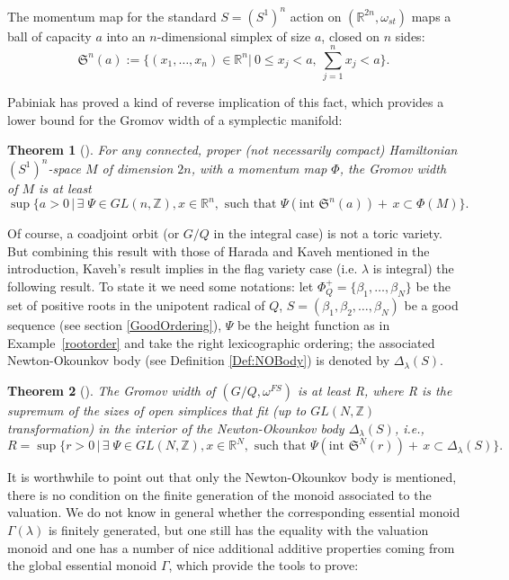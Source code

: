 \documentclass{emsprocart}
\newtheorem{theorem}{Theorem}[section]
\theoremstyle{definition}
\begin{document}
The momentum map for the standard $S=(S^1)^n$ action on $(\mathbb R^{2n}, \omega_{st})$ maps a ball of capacity $a$ into 
an $n$-dimensional simplex of size $a$, closed on $n$ sides: 
\begin{equation}\label{simplex}
\mathfrak S^n(a):=\{(x_1,\ldots,x_n) \in \mathbb R^n|\ 0\leq x_j< a,\  \sum_{j=1}^n x_j< a\}.
\end{equation}

Pabiniak has proved a kind of reverse implication of this fact, which provides a lower bound for the Gromov width
of a symplectic manifold: 
\begin{theorem}[\cite{Pa}]\label{embedding}
For any connected, proper (not necessarily compact) Hamiltonian $(S^1)^n$-space $M$ 
of dimension $2n$, with a momentum map $\Phi$, the Gromov width of $M$ is at least
$$\sup \{a>0\,|\, \exists \; \Psi \in GL(n,\mathbb Z), x \in
\mathbb R^n,\textrm{ such that }
\Psi (\textrm{int }\mathfrak S^n(a))+\,x \subset \Phi(M) \}.
$$
\end{theorem}

Of course, a coadjoint orbit (or $G/Q$ in the integral case) is not a toric variety. 
But combining this result with those of Harada and Kaveh \cite{HK} mentioned in the introduction,
Kaveh's result implies in the flag variety case (i.e. $\lambda$ is integral) the following result. To state it we need some notations: let $\Phi^+_Q=\{\beta_1,\ldots,\beta_N\}$ be the set of positive roots in the unipotent radical of $Q$, $S=(\beta_1,\beta_2,\ldots,\beta_N)$ be a good sequence (see section \ref{GoodOrdering}), $\Psi$ be the height function as in Example~\ref{rootorder} and take the right lexicographic ordering; the associated Newton-Okounkov body (see Definition \ref{Def:NOBody}) is denoted by $\Delta_\lambda (S)$.

\begin{theorem}[\cite{K2}]
The Gromov width of $(G/Q,\omega^{FS})$ is at least R, where R is the supremum of
the sizes of open simplices  that fit (up to $GL(N,\mathbb Z)$ transformation) in the interior of the Newton-Okounkov body $\Delta_\lambda (S)$, \emph{i.e.},
$$R= \sup \{r>0\,|\, \exists \; \Psi \in GL(N,\mathbb Z), x \in
\mathbb R^N,\textrm{ such that }\Psi (\textrm{int }\mathfrak S^N(r))+\,x \subset \Delta_\lambda (S) \}.$$
\end{theorem}

It is worthwhile to point out that only the Newton-Okounkov body is mentioned, there is no condition on the finite generation of the monoid associated to the valuation. We do not know in general whether the corresponding essential monoid $\Gamma(\lambda)$ is finitely generated, but one still has the equality with the valuation monoid
and one has a number of nice additional additive properties coming from the global essential monoid $\Gamma$, which provide the tools to prove:
\end{document}
